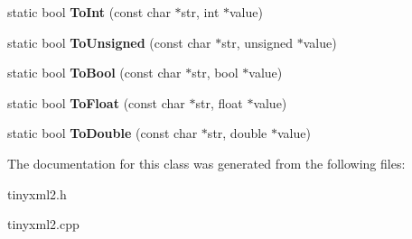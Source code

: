 \begin{DoxyCompactItemize}
\item 
\hypertarget{classtinyxml2_1_1_x_m_l_util_ad4df4023d11ee3fca9689c49b9707323}{static bool {\bfseries To\-Int} (const char $\ast$str, int $\ast$value)}\label{classtinyxml2_1_1_x_m_l_util_ad4df4023d11ee3fca9689c49b9707323}

\item 
\hypertarget{classtinyxml2_1_1_x_m_l_util_a210c8637d5eb4ce3d4625294af0efc2f}{static bool {\bfseries To\-Unsigned} (const char $\ast$str, unsigned $\ast$value)}\label{classtinyxml2_1_1_x_m_l_util_a210c8637d5eb4ce3d4625294af0efc2f}

\item 
\hypertarget{classtinyxml2_1_1_x_m_l_util_ae5b03e0a1ca5d42052a7ac540f7aa12a}{static bool {\bfseries To\-Bool} (const char $\ast$str, bool $\ast$value)}\label{classtinyxml2_1_1_x_m_l_util_ae5b03e0a1ca5d42052a7ac540f7aa12a}

\item 
\hypertarget{classtinyxml2_1_1_x_m_l_util_a399e71edb5f29d61ea81d91ee0332bb9}{static bool {\bfseries To\-Float} (const char $\ast$str, float $\ast$value)}\label{classtinyxml2_1_1_x_m_l_util_a399e71edb5f29d61ea81d91ee0332bb9}

\item 
\hypertarget{classtinyxml2_1_1_x_m_l_util_ad8f75ac140fb19c1c6e164a957c4cd53}{static bool {\bfseries To\-Double} (const char $\ast$str, double $\ast$value)}\label{classtinyxml2_1_1_x_m_l_util_ad8f75ac140fb19c1c6e164a957c4cd53}

\end{DoxyCompactItemize}


The documentation for this class was generated from the following files\-:\begin{DoxyCompactItemize}
\item 
tinyxml2.\-h\item 
tinyxml2.\-cpp\end{DoxyCompactItemize}
